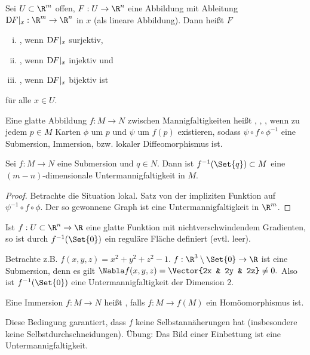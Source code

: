 \begin{df} \label{2.4}
    Sei $U \subset \R^m$ offen, $F: U \to \R^n$ eine Abbildung mit Ableitung $\Df[F]|_{x}: \R^m \to \R^n$ in $x$ (als lineare Abbildung).
    Dann heißt $F$
    \begin{enumerate}[i)]
        \item
            , wenn $\Df[F]|_{x}$ surjektiv,
        \item
            , wenn $\Df[F]|_{x}$ injektiv und
        \item
            , wenn $\Df[F]|_{x}$ bijektiv ist
    \end{enumerate}
    für alle $x \in U$.

    Eine glatte Abbildung $f: M \to N$ zwischen Mannigfaltigkeiten heißt , , , wenn zu jedem $p \in M$ Karten $\phi$ um $p$ und $\psi$ um $f(p)$ existieren, sodass $\psi \circ f \circ \phi^{-1}$ eine Submersion, Immersion, bzw. lokaler Diffeomorphismus ist.
\end{df}

\begin{st} \label{2.5}
    Sei $f: M \to N$ eine Submersion und $q \in N$.
    Dann ist $f^{-1}(\Set{q}) \subset M$ eine $(m - n)$-dimensionale Untermannigfaltigkeit in $M$.
    \begin{proof}
        Betrachte die Situation lokal.
        Satz von der impliziten Funktion auf $\psi^{-1} \circ f \circ \phi$.
        Der so gewonnene Graph ist eine Untermannigfaltigkeit in $\R^m$.
    \end{proof}
\end{st}

\begin{ex*}
    Ist $f: U \subset \R^n \to \R$ eine glatte Funktion mit nichtverschwindendem Gradienten, so ist durch $f^{-1}(\Set{0})$ ein reguläre Fläche definiert (evtl. leer).

    Betrachte z.B. $f(x,y,z) = x^2 + y^2 + z^2 - 1$.
    $f:\R^3 \setminus \Set{0} \to \R$ ist eine Submersion,
    denn es gilt
    \begin{math}
        \Nabla f(x,y,z) = \Vector{2x & 2y & 2z} \neq 0.
    \end{math}
    Also ist $f^{-1}(\Set{0})$ eine Untermannigfaltigkeit der Dimension 2.
\end{ex*}

\begin{df} \label{2.6}
    Eine Immersion $f:M \to N$ heißt , falls $f: M \to f(M)$ ein Homöomorphismus ist.
    \begin{note}
        Diese Bedingung garantiert, dass $f$ keine Selbstannäherungen hat (insbesondere keine Selbstdurchschneidungen).
        Übung: Das Bild einer Einbettung ist eine Untermannigfaltigkeit.
    \end{note}
\end{df}

